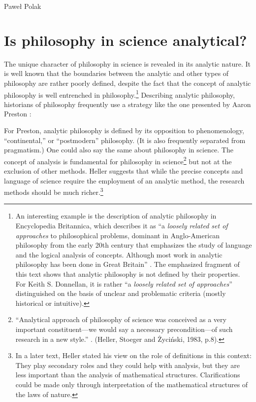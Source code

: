 \begin{artengenv}{Paweł Polak}
\section{Is philosophy in science analytical?}
The unique character of philosophy in science is revealed in its analytic nature. It is well known that the boundaries
between the analytic and other types of philosophy are rather poorly defined, despite the fact that the concept of
analytic philosophy is well entrenched in philosophy.\footnote{An interesting example is the description of analytic
philosophy in Encyclopedia Britannica, which describes it as ``a \textit{loosely related set of approaches} to
philosophical problems, dominant in Anglo-American philosophy from the early 20th century that emphasizes the study of
language and the logical analysis of concepts. Although most work in analytic philosophy has been done in Great
Britain''
\parencite{pol_preston_analytic_nodate}.
The emphasized fragment of this text shows that analytic philosophy is not defined by their
properties. For Keith S. Donnellan, it is rather ``a \textit{loosely related set of approaches}'' distinguished on the
basis of unclear and problematic criteria (mostly historical or intuitive).} Describing
analytic philosophy, historians of philosophy frequently use a strategy like the one presented by Aaron Preston
\parencite*{pol_preston_analytic_nodate}:




For Preston, analytic philosophy is defined by its opposition to phenomenology, ``continental,'' or ``postmodern''
philosophy. (It is also frequently separated from pragmatism.) One could also say the same about philosophy in science.
The concept of analysis is fundamental for philosophy in science\footnote{``Analytical approach of philosophy of science
was conceived as a very important constituent—we would say a necessary precondition—of such research in a new style.''
\parencite[p.8]{pol_heller_introduction_1983}.
(Heller, Stoeger and Życiński, 1983, p.8).
} but not at the exclusion of other methods. Heller suggests that while the
precise concepts and language of science require the employment of an analytic method, the research methods should be
much richer.\footnote{In a later text, Heller stated his view on the role of definitions in this context: They play
secondary roles and they could help with analysis, but they are less important than the analysis of mathematical
structures. Clarifications could be made only through interpretation of the mathematical structures of the laws of
nature.}


\end{artengenv}
